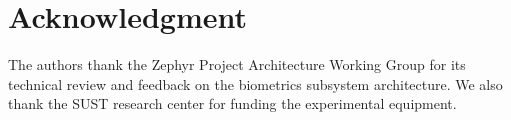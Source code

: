 \section*{Acknowledgment}
The authors thank the Zephyr Project Architecture Working Group for its technical review and feedback on the biometrics subsystem architecture. We also thank the SUST research center for funding the experimental equipment.
